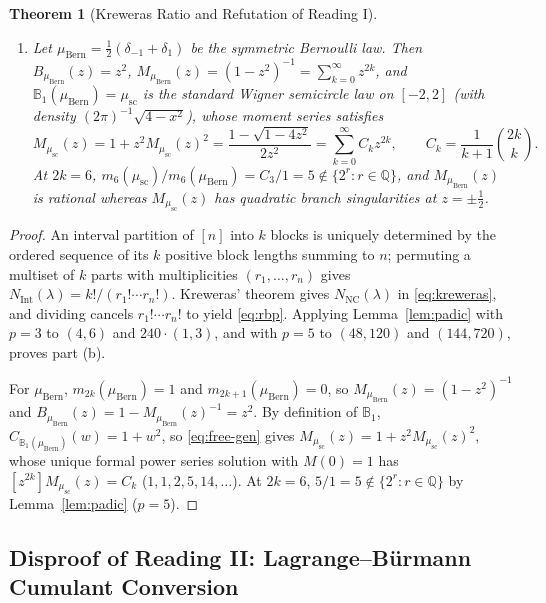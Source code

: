 \documentclass[11pt,a4paper]{article}
\newtheorem{theorem}{Theorem}[section]
\theoremstyle{definition}
\theoremstyle{remark}
\newcommand{\NC}{\mathrm{NC}}
\newcommand{\IntP}{\mathrm{Int}}
\newcommand{\BP}{\mathbb{B}_1}
\newcommand{\Bern}{\mu_{\mathrm{Bern}}}
\newcommand{\Wig}{\mu_{\mathrm{sc}}}
\begin{document}
\begin{theorem}[Kreweras Ratio and Refutation of Reading I]
\begin{enumerate}
\begin{itemize}
  \end{itemize}
  \item[(c)] Let $\Bern = \frac{1}{2}(\delta_{-1} + \delta_1)$ be the symmetric Bernoulli law. Then $B_{\Bern}(z) = z^2$, $M_{\Bern}(z) = (1 - z^2)^{-1} = \sum_{k=0}^\infty z^{2k}$, and $\BP(\Bern) = \Wig$ is the standard Wigner semicircle law on $[-2, 2]$ (with density $(2\pi)^{-1}\sqrt{4-x^2}$), whose moment series satisfies
  \[
    M_{\Wig}(z) = 1 + z^2 M_{\Wig}(z)^2 = \frac{1 - \sqrt{1 - 4z^2}}{2z^2} = \sum_{k=0}^{\infty} C_k z^{2k}, \qquad C_k = \frac{1}{k+1}\binom{2k}{k}.
  \]
  At $2k = 6$, $m_6(\Wig)/m_6(\Bern) = C_3 / 1 = 5 \notin \{2^r : r \in \mathbb{Q}\}$, and $M_{\Bern}(z)$ is rational whereas $M_{\Wig}(z)$ has quadratic branch singularities at $z = \pm \frac{1}{2}$.
\end{enumerate}
\end{theorem}

\begin{proof}
An interval partition of $[n]$ into $k$ blocks is uniquely determined by the ordered sequence of its $k$ positive block lengths summing to $n$; permuting a multiset of $k$ parts with multiplicities $(r_1, \dots, r_n)$ gives $N_{\IntP}(\lambda) = k! / (r_1! \cdots r_n!)$. Kreweras' theorem \cite[Th\'eor\`eme~4]{Kreweras1972} gives $N_{\NC}(\lambda)$ in \eqref{eq:kreweras}, and dividing cancels $r_1! \cdots r_n!$ to yield \eqref{eq:rbp}. Applying Lemma~\ref{lem:padic} with $p = 3$ to $(4, 6)$ and $240 \cdot (1, 3)$, and with $p = 5$ to $(48, 120)$ and $(144, 720)$, proves part (b).

For $\Bern$, $m_{2k}(\Bern) = 1$ and $m_{2k+1}(\Bern) = 0$, so $M_{\Bern}(z) = (1 - z^2)^{-1}$ and $B_{\Bern}(z) = 1 - M_{\Bern}(z)^{-1} = z^2$. By definition of $\BP$, $C_{\BP(\Bern)}(w) = 1 + w^2$, so \eqref{eq:free-gen} gives $M_{\Wig}(z) = 1 + z^2 M_{\Wig}(z)^2$, whose unique formal power series solution with $M(0) = 1$ has $[z^{2k}] M_{\Wig}(z) = C_k$ ($1, 1, 2, 5, 14, \dots$). At $2k = 6$, $5/1 = 5 \notin \{2^r : r \in \mathbb{Q}\}$ by Lemma~\ref{lem:padic} ($p = 5$).
\end{proof}

\subsection{Disproof of Reading II: Lagrange--B\"urmann Cumulant Conversion}
\end{document}
